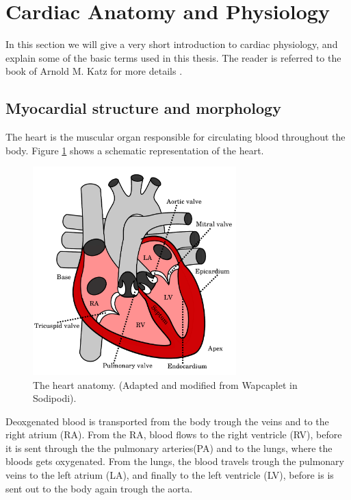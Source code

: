 \section{Cardiac Anatomy and Physiology}
\label{sec:intro_physiology}
In this section we will give a very short introduction to cardiac
physiology, and explain some of the basic terms used in this
thesis. The reader is referred to the book of Arnold M. Katz for 
more details \cite{katz2010physiology}.


\subsection{Myocardial structure and morphology}
The heart is the muscular organ responsible for circulating blood
throughout the body. Figure \ref{fig:heart_anatomy} shows a schematic
representation of the heart. 


\begin{figure}[htbp]
  \centering
    \includegraphics[width=0.7\textwidth]{chapters/introduction/figures/heart_anatomy.pdf}
\caption{The heart anatomy. (Adapted and modified from Wapcaplet in Sodipodi).}
\label{fig:heart_anatomy}
\end{figure}


Deoxgenated blood is transported from the body trough the veins and to
the right atrium (RA). From the RA, blood flows to the right ventricle
(RV), before it is sent through the the pulmonary arteries(PA) and to the
lungs, where the bloods gets oxygenated. From the lungs, the blood
travels trough the pulmonary veins to the left atrium (LA), and
finally to the left ventricle (LV), before is is sent out to the body
again trough the aorta.

